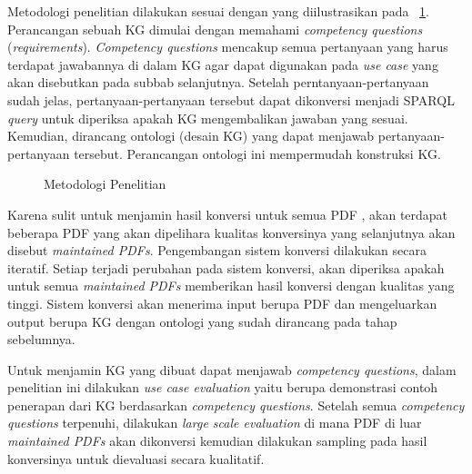 Metodologi penelitian dilakukan sesuai dengan yang diilustrasikan pada \pic~\ref{fig:metodologi}.
Perancangan sebuah KG dimulai dengan memahami \textit{competency questions} (\textit{requirements}).
\textit{Competency questions} mencakup semua pertanyaan yang harus terdapat jawabannya di dalam KG
agar dapat digunakan pada \textit{use case} yang akan disebutkan pada subbab selanjutnya. Setelah
perntanyaan-pertanyaan sudah jelas, pertanyaan-pertanyaan tersebut dapat dikonversi menjadi SPARQL
\textit{query} untuk diperiksa apakah KG mengembalikan jawaban yang sesuai. Kemudian, dirancang
ontologi (desain KG) yang dapat menjawab pertanyaan-pertanyaan tersebut. Perancangan ontologi ini
mempermudah konstruksi KG.

\begin{figure}
  \centering
  \caption{Metodologi Penelitian}
  \label{fig:metodologi}
\end{figure}

Karena sulit untuk menjamin hasil konversi untuk semua PDF \legal, akan terdapat beberapa PDF yang
akan dipelihara kualitas konversinya yang selanjutnya akan disebut \textit{maintained PDFs}.
Pengembangan sistem konversi dilakukan secara iteratif. Setiap terjadi perubahan pada sistem
konversi, akan diperiksa apakah untuk semua \textit{maintained PDFs} memberikan hasil konversi
dengan kualitas yang tinggi. Sistem konversi akan menerima input berupa PDF dan mengeluarkan output
berupa KG dengan ontologi yang sudah dirancang pada tahap sebelumnya.

Untuk menjamin KG yang dibuat dapat menjawab \textit{competency questions}, dalam penelitian ini
dilakukan \textit{use case evaluation} yaitu berupa demonstrasi contoh penerapan dari KG berdasarkan
\textit{competency questions}. Setelah semua \textit{competency questions} terpenuhi, dilakukan
\textit{large scale evaluation} di mana PDF di luar \textit{maintained PDFs} akan dikonversi kemudian
dilakukan sampling pada hasil konversinya untuk dievaluasi secara kualitatif.

